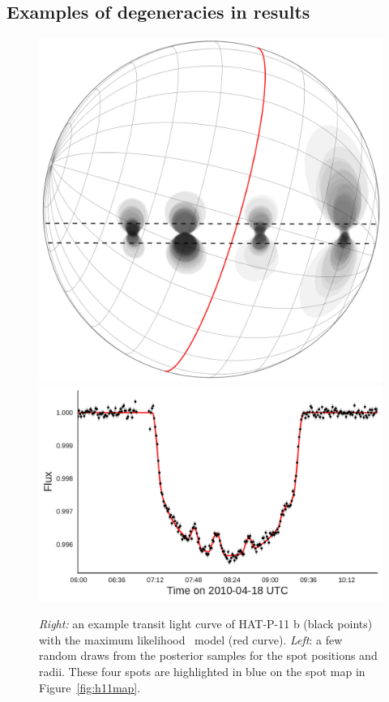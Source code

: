 \subsection{Examples of degeneracies in results}


\begin{figure}
\centering
\includegraphics[scale=0.4]{stsp_hat_p_11/transit063.pdf}
\includegraphics[scale=0.45]{stsp_hat_p_11/lc_063.pdf}
\caption{\textit{Right:} an example transit light curve of HAT-P-11 b (black points) with the maximum likelihood \stsp\ model (red curve). \textit{Left}: a few random draws from the posterior samples for the spot positions and radii. These four spots are highlighted in blue on the spot map in Figure~\ref{fig:h11map}.}
\label{fig:transit_063}
\end{figure}

